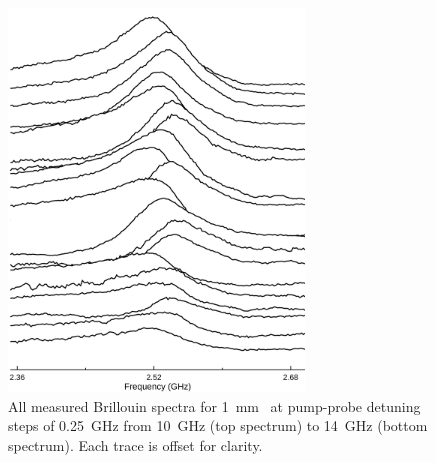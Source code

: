 \begin{figure}[ht]
  \centering
  \includegraphics[width=0.7\textwidth]{figs/3-CoBS/JoyDivisionCoBSCS2.pdf}
  \caption[All measured Brillouin spectra for \SI{1}{\milli\meter}~ at pump-probe detuning steps of \SI{0.25}{\giga\hertz} from \SI{10}{\giga\hertz} to \SI{14}{\giga\hertz}.]{All measured Brillouin spectra for \SI{1}{\milli\meter}~ at pump-probe detuning steps of \SI{0.25}{\giga\hertz} from \SI{10}{\giga\hertz} (top spectrum) to \SI{14}{\giga\hertz} (bottom spectrum). Each trace is offset for clarity.}
  \label{fig:Joy Division CS2}
\end{figure}

\FloatBarrier

